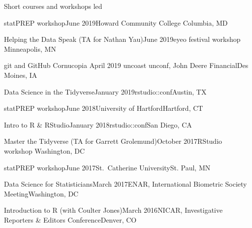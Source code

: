 \documentclass{resume} %
\begin{document}

\begin{rSection}{Short courses and workshops led}

\begin{sSubsection}{statPREP workshop}{}{June 2019}{Howard Community College }{Columbia, MD}
\end{sSubsection}

\begin{sSubsection}{Helping the Data Speak}{ (TA for Nathan Yau)}{June 2019}{eyeo festival workshop }{Minneapolis, MN}
\end{sSubsection}

\begin{sSubsection}{git and GitHub Cornucopia}{ }{April 2019}{ uncoast unconf, John Deere Financial}{Des Moines, IA}
\end{sSubsection}

\begin{sSubsection}{Data Science in the Tidyverse}{}{January 2019}{rstudio::conf}{Austin, TX}
\end{sSubsection}

\begin{sSubsection}{statPREP workshop}{}{June 2018}{University of Hartford}{Hartford, CT}
\end{sSubsection}

\begin{sSubsection}{Intro to R \& RStudio}{}{January 2018}{rstudio::conf}{San Diego, CA}
\end{sSubsection}

\begin{sSubsection}{Master the Tidyverse}{ (TA for Garrett Grolemund)}{October 2017}{RStudio workshop }{Washington, DC}
\end{sSubsection}

\begin{sSubsection}{statPREP workshop}{}{June 2017}{St.~Catherine University}{St. Paul, MN}
\end{sSubsection}

\begin{sSubsection}{Data Science for Statisticians}{}{March 2017}{ENAR, International Biometric Society Meeting}{Washington, DC}
\end{sSubsection}

\begin{sSubsection}{Introduction to R }{(with Coulter Jones)}{March 2016}{NICAR, Investigative Reporters \& Editors Conference}{Denver, CO}
\end{sSubsection}



\end{rSection}
\end{document}

